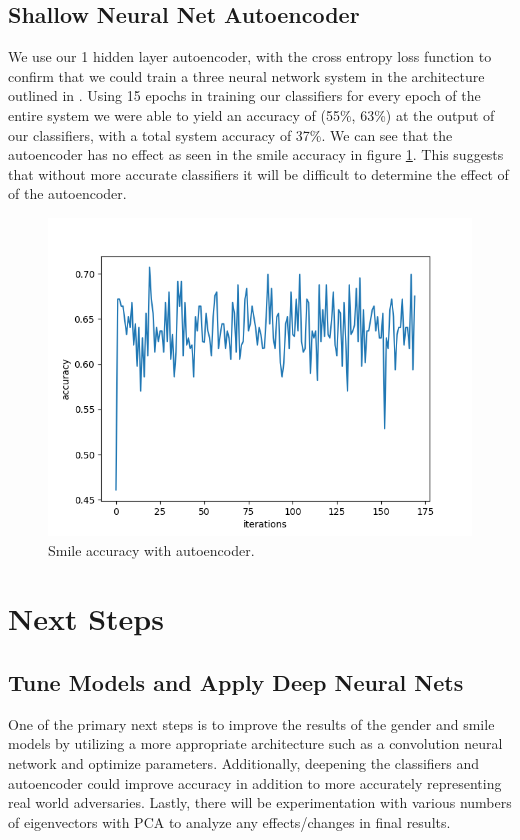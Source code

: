 \documentclass[10pt,twocolumn,letterpaper]{article}
\begin{document}
\subsection{Shallow Neural Net Autoencoder}
We use our 1 hidden layer autoencoder, with the cross entropy loss function to confirm that we could train a three neural network system in the architecture outlined in \cite{GAP}. Using 15 epochs in training our classifiers for every epoch of the entire system we were able to yield an accuracy of (55\%, 63\%) at the output of our classifiers, with a total system accuracy of 37\%. We can see that the autoencoder has no effect as seen in the smile accuracy in figure \ref{fig:btr_smile}. This suggests that without more accurate classifiers it will be difficult to determine the effect of of the autoencoder.
\begin{figure}[h]
\includegraphics[width=\columnwidth]{smile_acc_all.png}
\centering
\caption{Smile accuracy with autoencoder.}
\label{fig:btr_smile}
\end{figure}
\section{Next Steps}
\subsection{Tune Models and Apply Deep Neural Nets}
One of the primary next steps is to improve the results of the gender and smile models by utilizing a more appropriate architecture such as a convolution neural network and optimize parameters. Additionally, 
deepening the classifiers and autoencoder could improve accuracy in addition to more accurately representing real world adversaries. Lastly, there will be experimentation with various numbers of eigenvectors with PCA to analyze any effects/changes in final results. 
\end{document}
